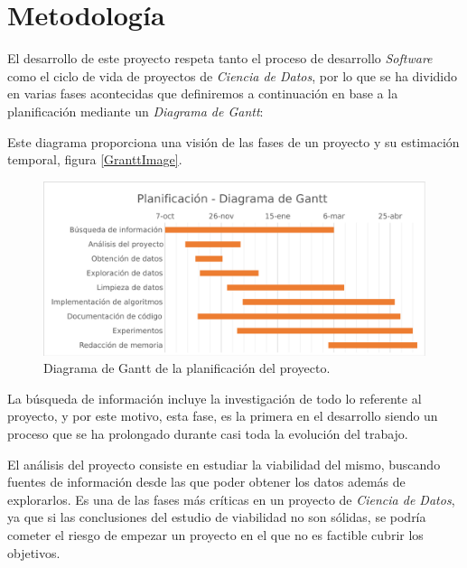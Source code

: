 
\chapter{Metodología}
\label{metodologia}

El desarrollo de este proyecto respeta tanto el proceso de desarrollo \textit{Software} como el ciclo de vida de proyectos de \textit{Ciencia de Datos}, por lo que se ha dividido en varias fases acontecidas que definiremos a continuación en base a la planificación mediante un \textit{Diagrama de Gantt}:

Este diagrama proporciona una visión de las fases de un proyecto y su estimación temporal, figura \eqref{GranttImage}.
\begin{figure}[H]
    \centering
    \includegraphics[width=15cm]{archivos/4.Metodologia/GranttImage}
    \caption{Diagrama de Gantt de la planificación del proyecto.}
    \label{GranttImage}
\end{figure}

La búsqueda de información incluye la investigación de todo lo referente al proyecto, y por este motivo, esta fase, es la primera en el desarrollo siendo un proceso que se ha prolongado durante casi toda la evolución del trabajo.

El análisis del proyecto consiste en estudiar la viabilidad del mismo, buscando fuentes de información desde las que poder obtener los datos además de explorarlos. Es una de las fases más críticas en un proyecto de \textit{Ciencia de Datos}, ya que si las conclusiones del estudio de viabilidad no son sólidas, se podría cometer el riesgo de empezar un proyecto en el que no es factible cubrir los objetivos.

